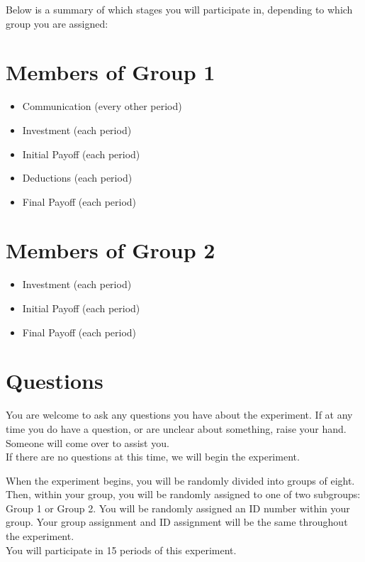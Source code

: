 \documentclass[12pt]{article}
\begin{document}
Below is a summary of which stages you will participate in, depending to which group you are assigned:

\section*{Members of Group 1}

\begin{itemize}
\item Communication (every other period)
\item Investment (each period)
\item Initial Payoff (each period)
\item Deductions (each period)
\item Final Payoff (each period)
\end{itemize}

\section*{Members of Group 2}

\begin{itemize}
\item Investment (each period)
\item Initial Payoff (each period)
\item Final Payoff (each period)
\end{itemize}


\section*{Questions}


You are welcome to ask any questions you have about the experiment.  If at any time you do have a question, or are unclear about something, raise your hand. Someone will come over to assist you.\\

If there are no questions at this time, we will begin the experiment.\\ 
\fi

When the experiment begins, you will be randomly divided into groups of eight. Then, within your group, you will be randomly assigned to one of two subgroups: Group 1 or Group 2. You will be randomly assigned an ID number within your group. Your group assignment and ID assignment will be the same throughout the experiment.\\

You will participate in 15 periods of this experiment.\\
\end{document}
